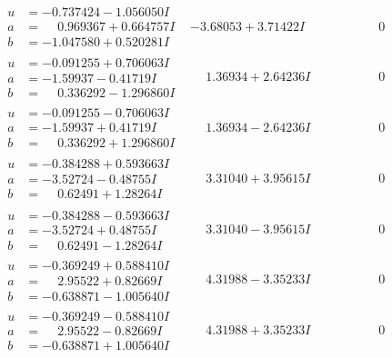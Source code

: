 \documentclass[1p]{elsarticle_modified}
\theoremstyle{definition}
\begin{document}
$$\begin{array}{c|c|c}
\begin{aligned}
u &= -0.737424 - 1.056050 I \\
a &= \phantom{-}0.969367 + 0.664757 I \\
b &= -1.047580 + 0.520281 I\end{aligned}
 & -3.68053 + 3.71422 I & \phantom{-0.000000 } 0 \\ \hline\begin{aligned}
u &= -0.091255 + 0.706063 I \\
a &= -1.59937 - 0.41719 I \\
b &= \phantom{-}0.336292 - 1.296860 I\end{aligned}
 & \phantom{-}1.36934 + 2.64236 I & \phantom{-0.000000 } 0 \\ \hline\begin{aligned}
u &= -0.091255 - 0.706063 I \\
a &= -1.59937 + 0.41719 I \\
b &= \phantom{-}0.336292 + 1.296860 I\end{aligned}
 & \phantom{-}1.36934 - 2.64236 I & \phantom{-0.000000 } 0 \\ \hline\begin{aligned}
u &= -0.384288 + 0.593663 I \\
a &= -3.52724 - 0.48755 I \\
b &= \phantom{-}0.62491 + 1.28264 I\end{aligned}
 & \phantom{-}3.31040 + 3.95615 I & \phantom{-0.000000 } 0 \\ \hline\begin{aligned}
u &= -0.384288 - 0.593663 I \\
a &= -3.52724 + 0.48755 I \\
b &= \phantom{-}0.62491 - 1.28264 I\end{aligned}
 & \phantom{-}3.31040 - 3.95615 I & \phantom{-0.000000 } 0 \\ \hline\begin{aligned}
u &= -0.369249 + 0.588410 I \\
a &= \phantom{-}2.95522 + 0.82669 I \\
b &= -0.638871 - 1.005640 I\end{aligned}
 & \phantom{-}4.31988 - 3.35233 I & \phantom{-0.000000 } 0 \\ \hline\begin{aligned}
u &= -0.369249 - 0.588410 I \\
a &= \phantom{-}2.95522 - 0.82669 I \\
b &= -0.638871 + 1.005640 I\end{aligned}
 & \phantom{-}4.31988 + 3.35233 I & \phantom{-0.000000 } 0\\

\end{array}$$
\end{document}
